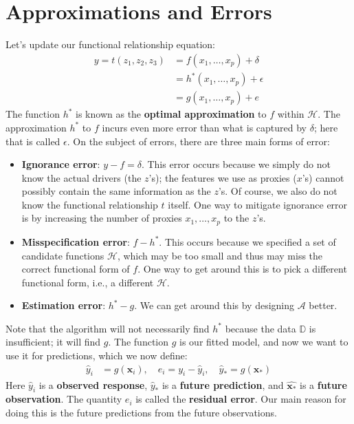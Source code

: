 \documentclass[12pt, a4paper]{article}
\begin{document}
	\section*{Approximations and Errors}
	Let's update our functional relationship equation:
	\begin{align*}
		y = t(z_1,z_2,z_3) &= f(x_1,\ldots,x_p) + \delta\\
		&= h^*(x_1,\ldots,x_p)+\epsilon\\
		&= g(x_1,\ldots,x_p) + e
	\end{align*}
	The function $h^*$ is known as the \textbf{optimal approximation} to $f$ within $\mathcal{H}$. The
	approximation $h^*$ to $f$ incurs even more error than what is captured by $\delta$;
	here that is called $\epsilon$. On the subject of errors, there are three main forms of
	error:
	\begin{itemize}
		\item \textbf{Ignorance error}: $y-f=\delta$. This error occurs because we simply do not
		know the actual drivers (the $z$'s); the features we use as proxies ($x$'s) cannot possibly
		contain the same information as the $z$'s. Of course, we also do not know the functional
		relationship $t$ itself. One way to mitigate ignorance error is by increasing the
		number of proxies $x_1,\ldots,x_p$ to the $z$'s.
		\item \textbf{Misspecification error}: $f-h^*$. This occurs because we specified a set
		of candidate functions $\mathcal{H}$, which may be too small and thus may miss
		the correct functional form of $f$. One way to get around this is to pick a different
		functional form, i.e., a different $\mathcal{H}$.
		\item \textbf{Estimation error}: $h^*-g$. We can get around this by designing $\mathcal{A}$ better.
	\end{itemize}
	Note that the algorithm will not necessarily find $h^*$ because the data $\mathbb{D}$
	is insufficient; it will find $g$. The function $g$ is our fitted model, and now we
	want to use it for predictions, which we now define:
	\begin{align*}
		\hat{y}_i &= g(\textbf{x}_i),\quad e_i = y_i-\hat{y}_i,\quad
		\hat{y}_* = g(\mathbf{x}_*)
	\end{align*}
	Here $\hat{y}_i$ is a \textbf{observed response}, $\hat{y}_*$ is a \textbf{future prediction}, and
	$\hat{\textbf{x}_*}$ is a \textbf{future observation}. The quantity $e_i$ is called the
	\textbf{residual error}. Our main reason for doing this is the future predictions from
	the future observations.
	
\end{document}
